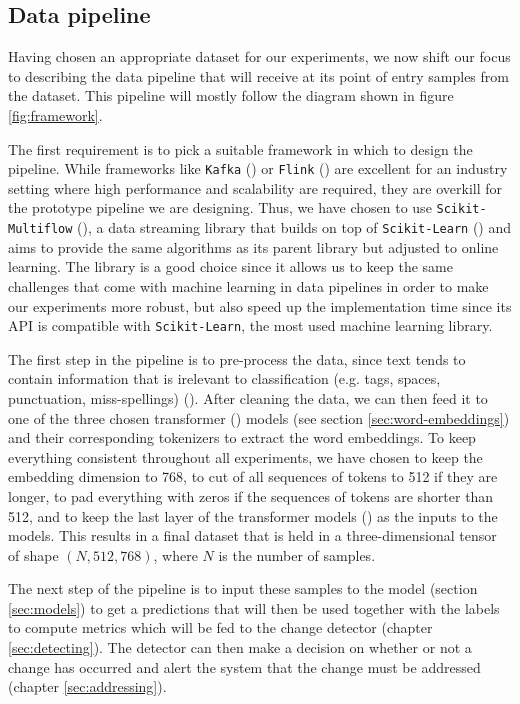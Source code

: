 \documentclass[12pt]{extreport}
\begin{document}
\subsection{Data pipeline}

Having chosen an appropriate dataset for our experiments, we now shift our focus to describing the data pipeline that will receive at its point of entry samples from the dataset. This pipeline will mostly follow the diagram shown in figure \ref{fig:framework}.

The first requirement is to pick a suitable framework in which to design the pipeline. While frameworks like \texttt{Kafka} (\cite{kafka}) or \texttt{Flink} (\cite{flink}) are excellent for an industry setting where high performance and scalability are required, they are overkill for the prototype pipeline we are designing. Thus, we have chosen to use \texttt{Scikit-Multiflow} (\cite{skmultiflow}), a data streaming library that builds on top of \texttt{Scikit-Learn} (\cite{sklearn}) and aims to provide the same algorithms as its parent library but adjusted to online learning. The library is a good choice since it allows us to keep the same challenges that come with machine learning in data pipelines in order to make our experiments more robust, but also speed up the implementation time since its API is compatible with \texttt{Scikit-Learn}, the most used machine learning library.

The first step in the pipeline is to pre-process the data, since text tends to contain information that is irelevant to classification (e.g. tags, spaces, punctuation, miss-spellings) (\cite{textclassification}). After cleaning the data, we can then feed it to one of the three chosen transformer (\cite{huggingface}) models (see section \ref{sec:word-embeddings}) and their corresponding tokenizers to extract the word embeddings. To keep everything consistent throughout all experiments, we have chosen to keep the embedding dimension to 768, to cut of all sequences of tokens to 512 if they are longer, to pad everything with zeros if the sequences of tokens are shorter than 512, and to keep the last layer of the transformer models (\cite{attention}) as the inputs to the models. This results in a final dataset that is held in a three-dimensional tensor of shape $(N, 512, 768)$, where $N$ is the number of samples.

The next step of the pipeline is to input these samples to the model (section \ref{sec:models}) to get a predictions that will then be used together with the labels to compute metrics which will be fed to the change detector (chapter \ref{sec:detecting}). The detector can then make a decision on whether or not a change has occurred and alert the system that the change must be addressed (chapter \ref{sec:addressing}).
\end{document}
